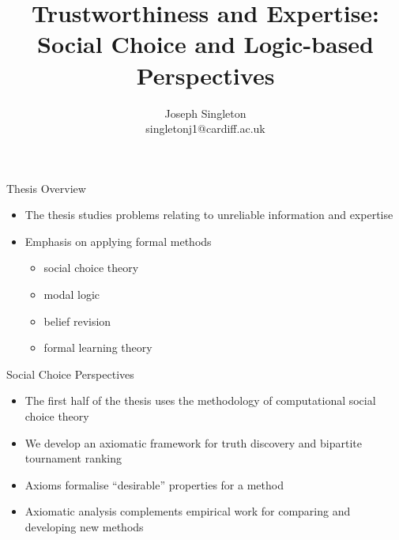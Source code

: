 \documentclass[10pt]{beamer}
\title{
    Trustworthiness and Expertise: Social Choice and Logic-based Perspectives
}
\date{}
\author{
    Joseph Singleton
    \\singletonj1@cardiff.ac.uk
}
\begin{document}
\maketitle

\begin{frame}{Thesis Overview}
    \begin{itemize}
        \item The thesis studies problems relating to \alert{unreliable
              information} and \alert{expertise}
        \item Emphasis on applying formal methods
        \begin{itemize}
            \item social choice theory
            \item modal logic
            \item belief revision
            \item formal learning theory
        \end{itemize}
    \end{itemize}
\end{frame}

\begin{frame}{Social Choice Perspectives}
    \begin{itemize}
        \item The first half of the thesis uses the methodology of
              computational social choice theory
          \item We develop an axiomatic framework for \alert{truth discovery}
              and \alert{bipartite tournament ranking}
        \item Axioms formalise ``desirable'' properties for a method
        \item Axiomatic analysis complements empirical work for comparing and
              developing new methods
    \end{itemize}
\end{frame}
\end{document}
